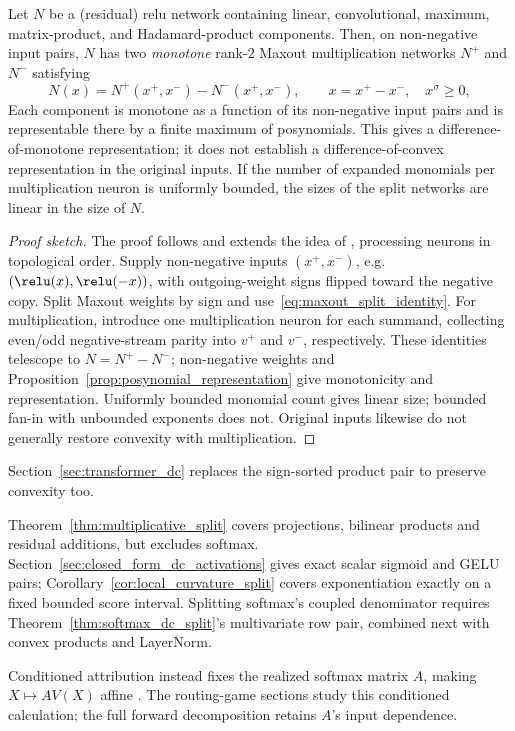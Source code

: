 \begin{theoremenv}\label{thm:multiplicative_split}
Let $N$ be a (residual) \ac{relu} network containing linear, convolutional, maximum, matrix-product, and Hadamard-product components. Then, on non-negative input pairs, $N$ has two \emph{monotone} rank-$2$ Maxout multiplication networks $N^{+}$ and $N^{-}$ satisfying
\begin{equation*}
	N(x) = N^{+}(x^+,x^-) - N^{-}(x^+,x^-), \qquad x=x^+-x^-,\quad x^\sigma\ge0,
\end{equation*}
Each component is monotone as a function of its non-negative input pairs and is representable there by a finite maximum of posynomials. This gives a difference-of-monotone representation; it does not establish a difference-of-convex representation in the original inputs. If the number of expanded monomials per multiplication neuron is uniformly bounded, the sizes of the split networks are linear in the size of $N$.\end{theoremenv}

\begin{proof}[Proof sketch]
The proof follows and extends the idea of \textcite{hertrich2025neuralnetworksvirtualextended}, processing neurons in topological order. Supply non-negative inputs $(x^+,x^-)$, e.g.\ $(\relu(x),\relu(-x))$, with outgoing-weight signs flipped toward the negative copy. Split Maxout weights by sign and use~\eqref{eq:maxout_split_identity}. For multiplication, introduce one multiplication neuron for each summand, collecting even/odd negative-stream parity into $v^+$ and $v^-$, respectively. These identities telescope to $N=N^+-N^-$; non-negative weights and Proposition~\ref{prop:posynomial_representation} give monotonicity and representation. Uniformly bounded monomial count gives linear size; bounded fan-in with unbounded exponents does not. Original inputs likewise do not generally restore convexity with multiplication.
\end{proof}

Section~\ref{sec:transformer_dc} replaces the sign-sorted product pair to preserve convexity too.

\begin{remark}\label{rem:smooth_gates}
Theorem~\ref{thm:multiplicative_split} covers projections, bilinear products and residual additions, but excludes softmax. Section~\ref{sec:closed_form_dc_activations} gives exact scalar sigmoid and GELU pairs; Corollary~\ref{cor:local_curvature_split} covers exponentiation exactly on a fixed bounded score interval. Splitting softmax's coupled denominator requires Theorem~\ref{thm:softmax_dc_split}'s multivariate row pair, combined next with convex products and LayerNorm.

Conditioned attribution instead fixes the realized softmax matrix $A$, making $X\mapsto AV(X)$ affine \parencite{Ali2022AttnLRP,Wrobel2024}. The routing-game sections study this conditioned calculation; the full forward decomposition retains $A$'s input dependence.
\end{remark}

